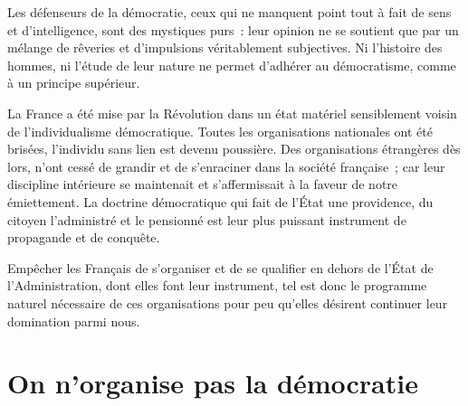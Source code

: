 \documentclass[french,twoside]{book} %
\newcommand{\astermono}{\medskip\centerline{\color{rubric}\large\selectfont{\syms ✻}}\medskip\par}%
\begin{document}
\astermono

\noindent Les défenseurs de la démocratie, ceux qui ne manquent point tout à fait de sens et d’intelligence, sont des mystiques purs : leur opinion ne se soutient que par un mélange de rêveries et d’impulsions véritablement subjectives. Ni l’histoire des hommes, ni l’étude de leur nature ne permet d’adhérer au démocratisme, comme à un principe supérieur.\par
La France a été mise par la Révolution dans un état matériel sensiblement voisin de l’individualisme démocratique. Toutes les organisations nationales ont été brisées, l’individu sans lien est devenu poussière. Des organisations étrangères dès lors, n’ont cessé de grandir et de s’enraciner dans la société française ; car leur discipline intérieure se maintenait et s’affermissait à la faveur de notre émiettement. La doctrine démocratique qui fait de l’État une providence, du citoyen l’administré et le pensionné est leur plus puissant instrument de propagande et de conquête.\par
Empêcher les Français de s’organiser et de se qualifier en dehors de l’État de l’Administration, dont elles font leur instrument, tel est donc le programme naturel nécessaire de ces organisations pour peu qu’elles désirent continuer leur domination parmi nous.
\section[On n’organise pas la démocratie]{On n’organise pas la démocratie}
\end{document}
